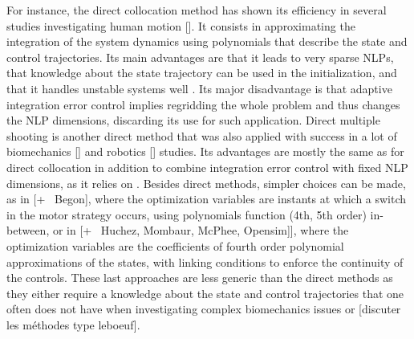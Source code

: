 For instance, the direct collocation method has shown its efficiency in several studies investigating human motion [\addref{}]. 
It consists in approximating the integration of the system dynamics using polynomials that describe the state and control trajectories.
Its main advantages are that it leads to very sparse NLPs, that knowledge about the state trajectory can be used in the initialization, and that it handles unstable systems well \cite{diehl2006fast}. 
Its major disadvantage is that adaptive integration error control implies regridding the whole problem and thus changes the NLP dimensions, discarding its use for such application.
Direct multiple shooting is another direct method that was also applied with success in a lot of biomechanics [\addref] and robotics [\addref] studies.
Its advantages are mostly the same as for direct collocation in addition to combine integration error control with fixed NLP dimensions, as it relies on .
Besides direct methods, simpler choices can be made, as in \cite{yeadon2000mechanics} [+ \addref\ Begon], where the optimization variables are instants at which a switch in the motor strategy occurs, using polynomials function (4th, 5th order) in-between, or in \cite{leboeuf2006energetic} [+ \addref\  Huchez, Mombaur, McPhee, Opensim]], where the optimization variables are the coefficients of fourth order polynomial approximations of the states, with linking conditions to enforce the continuity of the controls. 
These last approaches are less generic than the direct methods as they either require a knowledge about the state and control trajectories that one often does not have when investigating complex biomechanics issues or [discuter les méthodes type leboeuf]. 


